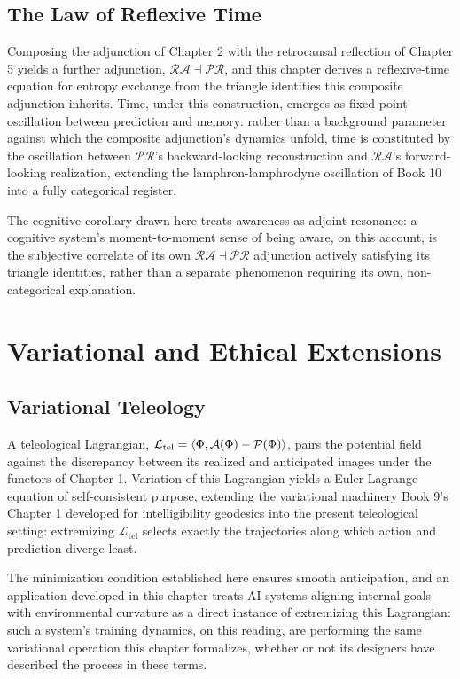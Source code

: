 \chapter{The Law of Reflexive Time}

Composing the adjunction of Chapter 2 with the retrocausal reflection of Chapter 5 yields a further adjunction, $\mathcal{R}\mathcal{A} \dashv \mathcal{P}\mathcal{R}$, and this chapter derives a reflexive-time equation for entropy exchange from the triangle identities this composite adjunction inherits. Time, under this construction, emerges as fixed-point oscillation between prediction and memory: rather than a background parameter against which the composite adjunction's dynamics unfold, time is constituted by the oscillation between $\mathcal{P}\mathcal{R}$'s backward-looking reconstruction and $\mathcal{R}\mathcal{A}$'s forward-looking realization, extending the lamphron-lamphrodyne oscillation of Book 10 into a fully categorical register.

The cognitive corollary drawn here treats awareness as adjoint resonance: a cognitive system's moment-to-moment sense of being aware, on this account, is the subjective correlate of its own $\mathcal{R}\mathcal{A} \dashv \mathcal{P}\mathcal{R}$ adjunction actively satisfying its triangle identities, rather than a separate phenomenon requiring its own, non-categorical explanation.

\part{Variational and Ethical Extensions}

\chapter{Variational Teleology}

A teleological Lagrangian, $\mathcal{L}_{\text{tel}} = \langle \Phi, \mathcal{A}(\Phi) - \mathcal{P}(\Phi) \rangle$, pairs the potential field against the discrepancy between its realized and anticipated images under the functors of Chapter 1. Variation of this Lagrangian yields a Euler-Lagrange equation of self-consistent purpose, extending the variational machinery Book 9's Chapter 1 developed for intelligibility geodesics into the present teleological setting: extremizing $\mathcal{L}_{\text{tel}}$ selects exactly the trajectories along which action and prediction diverge least.

The minimization condition established here ensures smooth anticipation, and an application developed in this chapter treats AI systems aligning internal goals with environmental curvature as a direct instance of extremizing this Lagrangian: such a system's training dynamics, on this reading, are performing the same variational operation this chapter formalizes, whether or not its designers have described the process in these terms.

